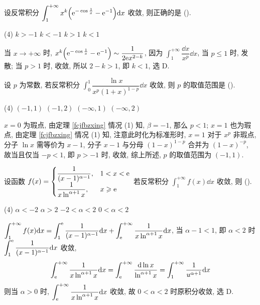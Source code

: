 \begin{example}
    设反常积分 $\displaystyle \int_{1}^{+\infty} x^{k}\qty(\mathrm{e} ^{-\cos \frac{1}{x}}-\mathrm{e} ^{-1}) \dd x$ 收敛, 则正确的是 (\quad).
    \begin{tasks}(4)
        \task $k>-1$
        \task $k<-1$
        \task $k>1$
        \task $k<1$
    \end{tasks}
\end{example}
\begin{solution}
    当 $x\to+\infty$ 时, $x^{k}\qty(\mathrm{e} ^{-\cos \frac{1}{x}}-\mathrm{e} ^{-1})\sim \dfrac{1}{2\mathrm{e} x^{2-k}}$, 
    因为 $\displaystyle \int_{1}^{+\infty} \dfrac{\dd x}{x^{p}} \dd x$, 当 $p\leqslant 1$ 时, 发散; 当 $p>1$ 时, 收敛, 所以 $2-k>1$, 即 $k<1$, 选 D.
\end{solution}

\begin{example}[2022 数二]
    设 $p$ 为常数, 若反常积分 $\displaystyle \int_{0}^{1} \dfrac{\ln x}{x^{p}(1+x)^{1-p}} \dd x$ 收敛, 则 $p$ 的取值范围是 (\quad).
    \begin{tasks}(4)
        \task $(-1,1)$
        \task $(-1,2)$
        \task $(-\infty,1)$
        \task $(-\infty,2)$
    \end{tasks}
\end{example}
\begin{solution}
    $x=0$ 为瑕点, 由定理 \ref{fcjfbzxing} 情况 (1) 知, $\beta=-1$, 那么 $p<1$; $x=1$ 也为瑕点, 由定理 \ref{fcjfbzxing} 情况 (1) 知, 注意此时化为标准形时, $x=1$ 对于 $x^{p}$ 非瑕点, 分子 $\ln x$ 需等价为 $x-1$, 分子 $x-1$ 与分母 $(1-x)^{1-p}$ 合并为 $(1-x)^{-p}$, 故当且仅当 $-p<1$, 即 $p>-1$ 时, 收敛, 综上所述, $p$ 的取值范围为 $(-1,1).$
\end{solution}

\begin{example}
    设函数 $f(x)=\begin{cases}
        \displaystyle \dfrac{1}{(x-1)^{\alpha-1}},&1<x<\mathrm{e} \\ 
        \displaystyle \dfrac{1}{x\ln^{\alpha+1}x},&x\geqslant \mathrm{e}
    \end{cases}$ 若反常积分 $\displaystyle \int_{1}^{+\infty} f(x) \dd x$ 收敛, 则 (\quad).
    \begin{tasks}(4)
        \task $\alpha<-2$
        \task $\alpha>2$
        \task $-2<\alpha<2$
        \task $0<\alpha<2$
    \end{tasks}
\end{example}
\begin{solution}
    $ \displaystyle \int_{1}^{+\infty} f(x) \dd x=\int_{1}^{\mathrm{e} } \dfrac{1}{(x-1)^{\alpha-1}} \dd x+\int_{\mathrm{e} }^{+\infty} \dfrac{1}{x\ln^{\alpha+1}x} \dd x $, 当 $\alpha-1<1$, 即 $\alpha<2$ 时 $\displaystyle \int_{1}^{\mathrm{e} } \dfrac{1}{(x-1)^{\alpha-1}} \dd x$ 收敛, 
    $$
    \int_{\mathrm{e} }^{+\infty} \dfrac{1}{x\ln ^{\alpha+1}x} \dd x=\int_{\mathrm{e} }^{+\infty} \dfrac{\dd \ln x}{\ln ^{\alpha+1}x} = \int_{1}^{+\infty} \dfrac{1}{u^{\alpha+1}} \dd x
    $$
    则当 $\alpha>0$ 时, $\displaystyle \int_{\mathrm{e} }^{+\infty} \dfrac{1}{x\ln ^{\alpha+1}x} \dd x$ 收敛, 故 $0<\alpha<2$ 时原积分收敛, 选 D.
\end{solution}


